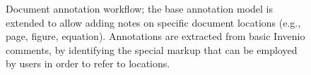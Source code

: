 \begin{figure}[!ht]
  \centering
  \caption[Document annotation workflow]
          {Document annotation workflow; the base annotation model is extended
           to allow adding notes on specific document locations (e.g., page,
           figure, equation). Annotations are extracted from basic Invenio
           comments, by identifying the special markup that can be employed by
           users in order to refer to locations.}
  \label{fig:docanno}
\end{figure}

\FloatBarrier

